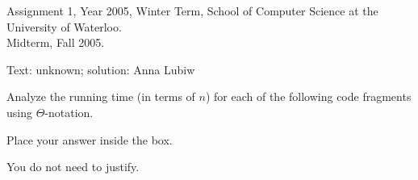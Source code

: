 \begin{usage}
Assignment 1, Year 2005, Winter Term, School of Computer Science at the University of Waterloo. \\
Midterm, Fall 2005.
\end{usage}
\begin{authorship}
Text: unknown; solution: Anna Lubiw
\end{authorship}

\newcommand{\answerbox}{
\hspace*{\fill}
\fbox{\rule{0mm}{10mm}\rule{50mm}{0mm}}
}


Analyze the running time (in terms of $n$) for each of the following
code fragments using $\Theta$-notation.  
%
\begin{spaceForAnswer}  Place your answer inside the box.\end{spaceForAnswer}%
%
You do not need to justify. 

